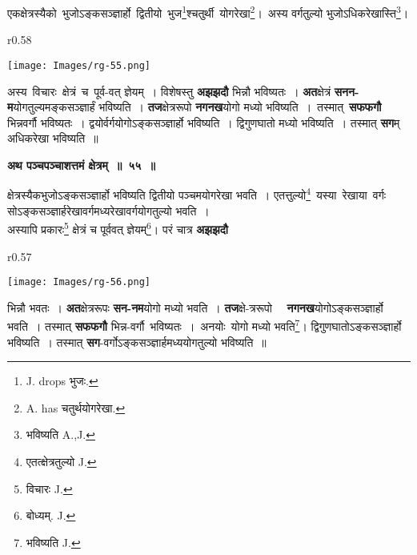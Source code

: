 \documentclass[11pt, openany]{book}
\begin{document}
{\ab एकक्षेत्रस्यैको \,भुजोऽङ्कसञ्ज्ञार्हो \,द्वितीयो \,भुज\renewcommand{\thefootnote}{१}\footnote{{\en J. drops} भुजः.}श्चतुर्थी \,योगरेखा\renewcommand{\thefootnote}{२}\footnote{{\en A. has} चतुर्थयोगरेखा.}\;। \,अस्य वर्गतुल्यो भुजोऽधिकरेखास्ति\renewcommand{\thefootnote}{३}\footnote{भविष्यति {\en A.,J.}}\;। }\\

\begin{wrapfigure}{r}{0.58\textwidth}
\vspace{-10mm}
\begin{flushright}
\texttt{[image: Images/rg-55.png]}
\end{flushright}
\vspace{-8mm}
\end{wrapfigure}

 अस्य \,विचारः \,क्षेत्रं \,च \,पूर्व-वत् ज्ञेयम्~। \;विशेषस्तु \;\textbf{अझझदौ} भिन्नौ भविष्यतः~। \textbf{अत}क्षेत्रं \textbf{सनन-म}योगतुल्यमङ्कसञ्ज्ञार्हं भविष्यति~। \textbf{तज}क्षेत्ररूपो \textbf{नगनख}योगो मध्यो भविष्यति~। \,तस्मात् \,\textbf{सफफगौ} भिन्नवर्गौ भविष्यतः~। द्वयोर्वर्गयोगोऽङ्कसञ्ज्ञार्हो भविष्यति~। द्विगुणघातो मध्यो भविष्यति~। तस्मात् \textbf{सग}म् अधिकरेखा भविष्यति~॥
\vspace{2mm}

\begin{center}
\textbf{\large  अथ पञ्चपञ्चाशत्तमं क्षेत्रम्~॥~५५~॥}
\end{center}

{\ab क्षेत्रस्यैकभुजोऽङ्कसञ्ज्ञार्हो \;भविष्यति \;द्वितीयो \;पञ्चमयोगरेखा \;भवति~। एतत्तुल्यो\renewcommand{\thefootnote}{४}\footnote{एतत्क्षेत्रतुल्यो {\en J.}} \,यस्या \,रेखाया \,वर्गः \,सोऽङ्कसञ्ज्ञार्हरेखावर्गमध्यरेखावर्गयोगतुल्यो भवति~।}\\

 अस्यापि प्रकारः\renewcommand{\thefootnote}{५}\footnote{विचारः {\en J.}} क्षेत्रं च पूर्ववत् ज्ञेयम्\renewcommand{\thefootnote}{६}\footnote{बोध्यम्. {\en J.}}\;। परं चात्र \textbf{अझझदौ}

\newpage

\begin{wrapfigure}{r}{0.57\textwidth}
\vspace{-4mm}
\begin{flushright}
\texttt{[image: Images/rg-56.png]}
\end{flushright}
\vspace{-8mm}
\end{wrapfigure}

\noindent भिन्नौ भवतः~। \textbf{अत}क्षेत्ररूपः \textbf{सन-नम}योगो मध्यो भवति~। \textbf{तज}क्षे-त्ररूपो ~~\textbf{नगनख}योगोऽङ्कसञ्ज्ञार्हो भवति~। तस्मात् \textbf{सफफगौ} भिन्न-वर्गौ \,भविष्यतः~। \,अनयोः \,योगो मध्यो भवति\renewcommand{\thefootnote}{१}\footnote{भविष्यति {\en J.}}\;। द्विगुणघातोऽङ्कसञ्ज्ञार्हो भविष्यति~। तस्मात् \textbf{सग}-वर्गोऽङ्कसञ्ज्ञार्हमध्ययोगतुल्यो भविष्यति~॥ 
\vspace{2mm}
\end{document}
